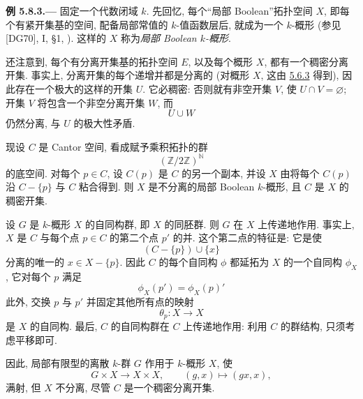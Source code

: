 
\medskip
{}\label{ex:sga3-VIB-5.8.3}%
\noindent\textbf{例 5.8.3.---}
固定一个代数闭域 \(k\). 先回忆, 每个``局部 Boolean''拓扑空间 \(X\),
即每个有紧开集基的空间, 配备局部常值的 \(k\)-值函数层后,
就成为一个 \(k\)-概形
(参见 [DG70], I, \S1, ).
这样的 \(X\) 称为\emph{局部 Boolean \(k\)-概形}.

还注意到, 每个有分离开集基的拓扑空间 \(E\),
以及每个概形 \(X\), 都有一个稠密分离开集.
事实上, 分离开集的每个递增并都是分离的
(对概形 \(X\), 这由 \hyperref[lem:sga3-VIB-5.6.3]{5.6.3} 得到),
因此存在一个极大的这样的开集 \(U\).
它必稠密: 否则就有非空开集 \(V\), 使 \(U\cap V=\varnothing\);
开集 \(V\) 将包含一个非空分离开集 \(W\), 而
\[
  U\cup W
\]
仍然分离, 与 \(U\) 的极大性矛盾.

现设 \(C\) 是 Cantor 空间, 看成赋予乘积拓扑的群
\[
  (\mathbb Z/2\mathbb Z)^{\mathbb N}
\]
的底空间. 对每个 \(p\in C\), 设 \(C(p)\) 是 \(C\) 的另一个副本,
并设 \(X\) 由将每个 \(C(p)\) 沿 \(C-\{p\}\) 与 \(C\) 粘合得到.
则 \(X\) 是不分离的局部 Boolean \(k\)-概形,
且 \(C\) 是 \(X\) 的稠密开集.

设 \(G\) 是 \(k\)-概形 \(X\) 的自同构群, 即 \(X\) 的同胚群.
则 \(G\) 在 \(X\) 上传递地作用.
事实上, \(X\) 是 \(C\) 与每个点 \(p\in C\) 的第二个点 \(p'\) 的并.
这个第二点的特征是: 它是使
\[
  (C-\{p\})\cup\{x\}
\]
分离的唯一的 \(x\in X-\{p\}\).
因此 \(C\) 的每个自同构 \(\phi\) 都延拓为 \(X\) 的一个自同构
\(\phi_X\), 它对每个 \(p\) 满足
\[
  \phi_X(p')=\phi_X(p)'
\]
此外, 交换 \(p\) 与 \(p'\) 并固定其他所有点的映射
\[
  \theta_p:X\longrightarrow X
\]
是 \(X\) 的自同构. 最后, \(C\) 的自同构群在 \(C\) 上传递地作用:
利用 \(C\) 的群结构, 只须考虑平移即可.

因此, 局部有限型的离散 \(k\)-群 \(G\) 作用于 \(k\)-概形 \(X\), 使
\[
  G\times X\longrightarrow X\times X,
  \qquad (g,x)\longmapsto(gx,x),
\]
满射, 但 \(X\) 不分离, 尽管 \(C\) 是一个稠密分离开集.

